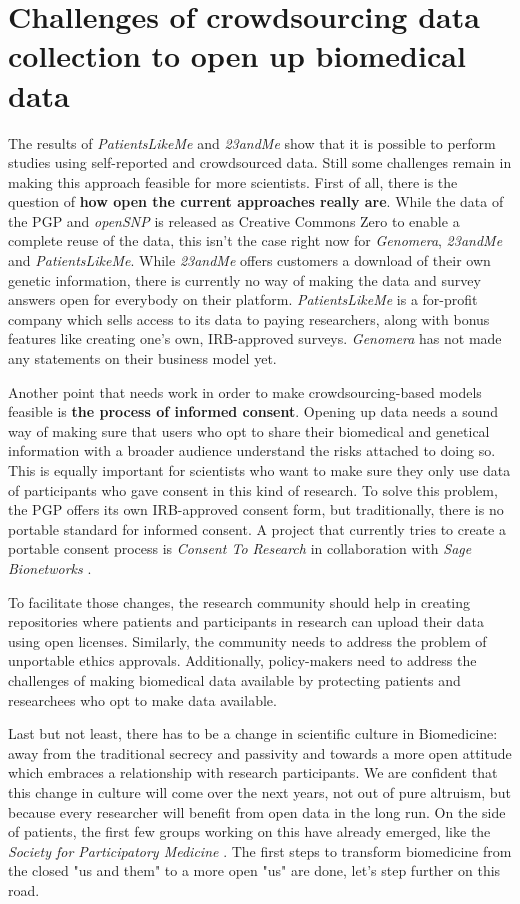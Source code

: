 \documentclass[runningheads,a4paper]{llncs}
\begin{document}
\section{Challenges of crowdsourcing data collection to open up biomedical data}
The results of \emph{PatientsLikeMe} and \emph{23andMe} show that it is possible to perform studies using self-reported and crowdsourced data. Still some challenges remain in making this approach feasible for more scientists. First of all, there is the question of \textbf{how open the current approaches really are}. While the data of the PGP and \emph{openSNP} is released as Creative Commons Zero to enable a complete reuse of the data, this isn't the case right now for \emph{Genomera}, \emph{23andMe} and \emph{PatientsLikeMe}. While \emph{23andMe} offers customers a download of their own genetic information, there is currently no way of making the data and survey answers open for everybody on their platform. \emph{PatientsLikeMe} is a for-profit company which sells access to its data to paying researchers, along with bonus features like creating one's own, IRB-approved surveys. \emph{Genomera} has not made any statements on their business model yet. 

Another point that needs work in order to make crowdsourcing-based models feasible is \textbf{the process of informed consent}. Opening up data needs a sound way of making sure that users who opt to share their biomedical and genetical information with a broader audience understand the risks attached to doing so. This is equally important for scientists who want to make sure they only use data of participants who gave consent in this kind of research. To solve this problem, the PGP offers its own IRB-approved consent form, but traditionally, there is no portable standard for informed consent. A project that currently tries to create a portable consent process is \emph{Consent To Research} \cite{weconsent} in collaboration with \emph{Sage Bionetworks} \cite{sage}. 

To facilitate those changes, the research community should help in creating repositories where patients and participants in research can upload their data using open licenses. Similarly, the community needs to address the problem of unportable ethics approvals. Additionally, policy-makers need to address the challenges of making biomedical data available by protecting patients and researchees who opt to make data available.

Last but not least, there has to be a change in scientific culture in Biomedicine: away from the traditional secrecy and passivity and towards a more open attitude which embraces a relationship with research participants. We are confident that this change in culture will come over the next years, not out of pure altruism, but because every researcher will benefit from open data in the long run. On the side of patients, the first few groups working on this have already emerged, like the \emph{Society for Participatory Medicine} \cite{partmed}. The first steps to transform biomedicine from the closed "us and them" to a more open "us" are done, let's step further on this road.
\end{document}
